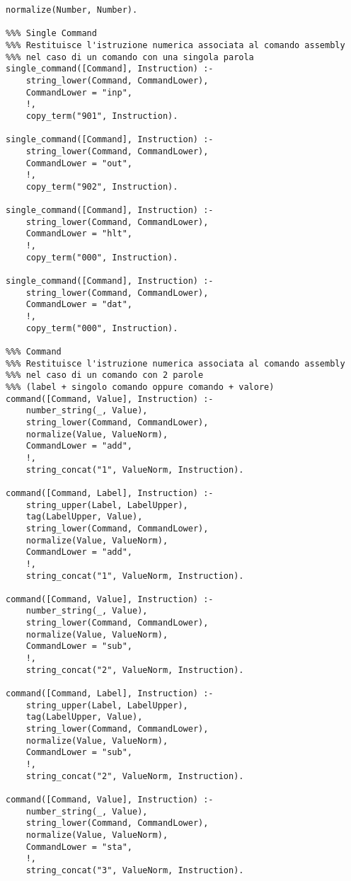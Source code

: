 \documentclass[a4paper,12pt, oneside]{book}
\begin{document}
\begin{verbatim}
normalize(Number, Number).

%%% Single Command
%%% Restituisce l'istruzione numerica associata al comando assembly
%%% nel caso di un comando con una singola parola
single_command([Command], Instruction) :- 
    string_lower(Command, CommandLower),
    CommandLower = "inp",
    !,
    copy_term("901", Instruction).

single_command([Command], Instruction) :- 
    string_lower(Command, CommandLower),
    CommandLower = "out",
    !,
    copy_term("902", Instruction).

single_command([Command], Instruction) :- 
    string_lower(Command, CommandLower),
    CommandLower = "hlt",
    !,
    copy_term("000", Instruction).

single_command([Command], Instruction) :- 
    string_lower(Command, CommandLower),
    CommandLower = "dat",
    !,
    copy_term("000", Instruction).

%%% Command 
%%% Restituisce l'istruzione numerica associata al comando assembly
%%% nel caso di un comando con 2 parole 
%%% (label + singolo comando oppure comando + valore)
command([Command, Value], Instruction) :- 
    number_string(_, Value),
    string_lower(Command, CommandLower), 
    normalize(Value, ValueNorm),           
    CommandLower = "add",
    !,
    string_concat("1", ValueNorm, Instruction).

command([Command, Label], Instruction) :- 
    string_upper(Label, LabelUpper),
    tag(LabelUpper, Value),
    string_lower(Command, CommandLower), 
    normalize(Value, ValueNorm),           
    CommandLower = "add",
    !,
    string_concat("1", ValueNorm, Instruction).

command([Command, Value], Instruction) :- 
    number_string(_, Value),
    string_lower(Command, CommandLower), 
    normalize(Value, ValueNorm),          
    CommandLower = "sub",
    !,
    string_concat("2", ValueNorm, Instruction).

command([Command, Label], Instruction) :- 
    string_upper(Label, LabelUpper),
    tag(LabelUpper, Value),
    string_lower(Command, CommandLower), 
    normalize(Value, ValueNorm),          
    CommandLower = "sub",
    !,
    string_concat("2", ValueNorm, Instruction).

command([Command, Value], Instruction) :- 
    number_string(_, Value),            
    string_lower(Command, CommandLower), 
    normalize(Value, ValueNorm),           
    CommandLower = "sta",
    !,
    string_concat("3", ValueNorm, Instruction).


\end{verbatim}
\end{document}
